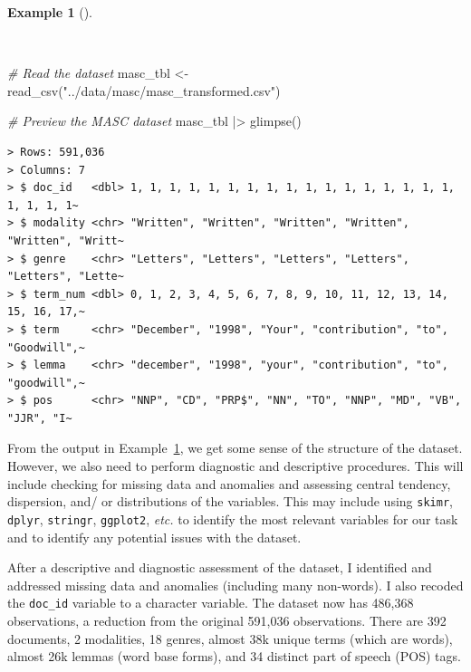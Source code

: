 \documentclass[
  letterpaper,
]{latex/krantz}
\newenvironment{Shaded}{\begin{snugshade}}{\end{snugshade}}
\newcommand{\CommentTok}[1]{\textcolor[rgb]{0.00,0.00,0.00}{\textit{#1}}}
\newcommand{\FunctionTok}[1]{\textcolor[rgb]{0.00,0.00,0.00}{#1}}
\newcommand{\NormalTok}[1]{\textcolor[rgb]{0.00,0.00,0.00}{#1}}
\newcommand{\OtherTok}[1]{\textcolor[rgb]{0.00,0.00,0.00}{#1}}
\newcommand{\SpecialCharTok}[1]{\textcolor[rgb]{0.00,0.00,0.00}{#1}}
\newcommand{\StringTok}[1]{\textcolor[rgb]{0.00,0.00,0.00}{#1}}
\theoremstyle{definition}
\newtheorem{example}{Example}[chapter]
\theoremstyle{remark}
\begin{document}
\begin{example}[]\protect\hypertarget{exm-eda-masc-read}{}\label{exm-eda-masc-read}

~

\begin{Shaded}
\begin{Highlighting}[]
\CommentTok{\# Read the dataset}
\NormalTok{masc\_tbl }\OtherTok{\textless{}{-}}
  \FunctionTok{read\_csv}\NormalTok{(}\StringTok{"../data/masc/masc\_transformed.csv"}\NormalTok{)}

\CommentTok{\# Preview the MASC dataset}
\NormalTok{masc\_tbl }\SpecialCharTok{|\textgreater{}} \FunctionTok{glimpse}\NormalTok{()}
\end{Highlighting}
\end{Shaded}

\begin{verbatim}
> Rows: 591,036
> Columns: 7
> $ doc_id   <dbl> 1, 1, 1, 1, 1, 1, 1, 1, 1, 1, 1, 1, 1, 1, 1, 1, 1, 1, 1, 1, 1~
> $ modality <chr> "Written", "Written", "Written", "Written", "Written", "Writt~
> $ genre    <chr> "Letters", "Letters", "Letters", "Letters", "Letters", "Lette~
> $ term_num <dbl> 0, 1, 2, 3, 4, 5, 6, 7, 8, 9, 10, 11, 12, 13, 14, 15, 16, 17,~
> $ term     <chr> "December", "1998", "Your", "contribution", "to", "Goodwill",~
> $ lemma    <chr> "december", "1998", "your", "contribution", "to", "goodwill",~
> $ pos      <chr> "NNP", "CD", "PRP$", "NN", "TO", "NNP", "MD", "VB", "JJR", "I~
\end{verbatim}

\end{example}

From the output in Example~\ref{exm-eda-masc-read}, we get some sense of
the structure of the dataset. However, we also need to perform
diagnostic and descriptive procedures. This will include checking for
missing data and anomalies and assessing central tendency, dispersion,
and/ or distributions of the variables. This may include using
\texttt{skimr}, \texttt{dplyr}, \texttt{stringr}, \texttt{ggplot2},
\emph{etc.} to identify the most relevant variables for our task and to
identify any potential issues with the dataset.

After a descriptive and diagnostic assessment of the dataset, I
identified and addressed missing data and anomalies (including many
non-words). I also recoded the \texttt{doc\_id} variable to a character
variable. The dataset now has 486,368 observations, a reduction from the
original 591,036 observations. There are 392 documents, 2 modalities, 18
genres, almost 38k unique terms (which are words), almost 26k lemmas
(word base forms), and 34 distinct part of speech (POS) tags.
\end{document}
